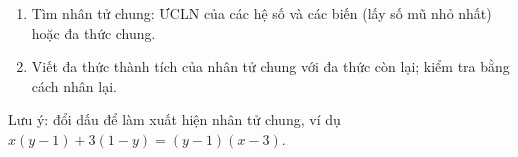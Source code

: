 \begin{enumerate}
\item Tìm nhân tử chung: ƯCLN của các hệ số và các biến (lấy số mũ nhỏ nhất) hoặc đa thức chung.
\item Viết đa thức thành tích của nhân tử chung với đa thức còn lại; kiểm tra bằng cách nhân lại.
\end{enumerate}
Lưu ý: đổi dấu để làm xuất hiện nhân tử chung, ví dụ $x(y-1)+3(1-y)=(y-1)(x-3)$.
